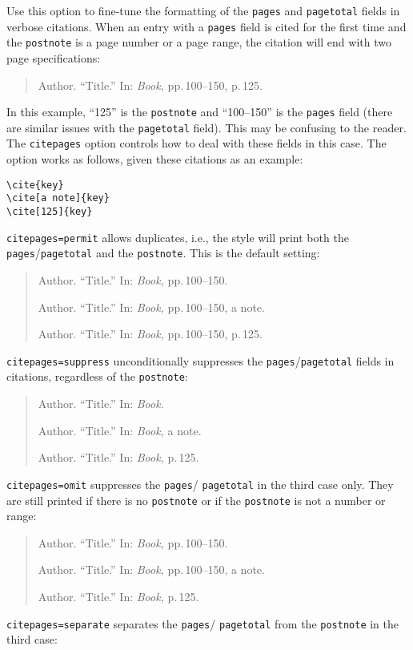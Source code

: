 \documentclass[a4paper]{article}
\begin{document}
Use this option to fine-tune the formatting of the \texttt{pages}
and \texttt{pagetotal} fields in verbose citations. When an entry
with a \texttt{pages} field is cited for the first time and the
\texttt{postnote} is a page number or a page range, the citation
will end with two page specifications:

\begin{quote}
Author. \enquote{Title.} In: \emph{Book,} pp.\,100--150, p.\,125.
\end{quote}
%
In this example, \enquote{125} is the \texttt{postnote} and
\enquote{100--150} is the \texttt{pages} field (there are similar
issues with the \texttt{pagetotal} field). This may be confusing to
the reader. The \texttt{citepages} option controls how to deal with
these fields in this case. The option works as follows, given these
citations as an example:

\begin{verbatim}
\cite{key}
\cite[a note]{key}
\cite[125]{key}
\end{verbatim}
%
\texttt{citepages=permit} allows duplicates, i.e., the style will
print both the \texttt{pages}\slash \texttt{pagetotal} and the
\texttt{postnote}. This is the default setting:

\begin{quote}
Author. \enquote{Title.} In: \emph{Book,} pp.\,100--150.

Author. \enquote{Title.} In: \emph{Book,} pp.\,100--150, a note.

Author. \enquote{Title.} In: \emph{Book,} pp.\,100--150, p.\,125.
\end{quote}
%
\texttt{citepages=suppress} unconditionally suppresses the
\texttt{pages}\slash \texttt{pagetotal} fields in citations,
regardless of the \texttt{postnote}:

\begin{quote}
Author. \enquote{Title.} In: \emph{Book.}

Author. \enquote{Title.} In: \emph{Book,} a note.

Author. \enquote{Title.} In: \emph{Book,} p.\,125.
\end{quote}
%
\texttt{citepages=omit} suppresses the \texttt{pages}\slash
\texttt{pagetotal} in the third case only. They are still printed if
there is no \texttt{postnote} or if the \texttt{postnote} is not a
number or range:

\begin{quote}
Author. \enquote{Title.} In: \emph{Book,} pp.\,100--150.

Author. \enquote{Title.} In: \emph{Book,} pp.\,100--150, a note.

Author. \enquote{Title.} In: \emph{Book,} p.\,125.
\end{quote}
%
\texttt{citepages=separate} separates the \texttt{pages}\slash
\texttt{pagetotal} from the \texttt{postnote} in the third case:
\end{document}
